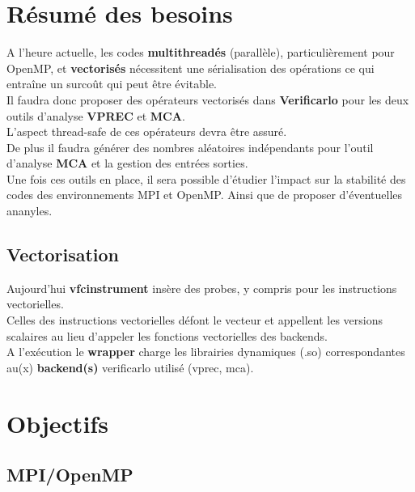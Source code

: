 \documentclass[11pt]{article}
\begin{document}
\section{Résumé des besoins}
\label{sec:orgefc274e}

A l'heure actuelle, les codes \textbf{multithreadés} (parallèle),
particulièrement pour OpenMP, et \textbf{vectorisés} nécessitent une 
sérialisation des opérations ce qui entraîne un surcoût qui peut
être évitable.
\\ \vspace{5mm}
Il faudra donc proposer des opérateurs vectorisés dans \textbf{Verificarlo}
pour les deux outils d'analyse \textbf{VPREC} et \textbf{MCA}.
\\ \vspace{5mm}
L'aspect thread-safe de ces opérateurs devra être assuré.
\\ \vspace{5mm}
De plus il faudra générer des nombres aléatoires indépendants pour
l'outil d'analyse \textbf{MCA} et la gestion des entrées sorties.
\\ \vspace{5mm}
Une fois ces outils en place, il sera possible d'étudier l'impact
sur la stabilité des codes des environnements MPI et OpenMP. Ainsi
que de proposer d'éventuelles ananyles.

\subsection{Vectorisation}
\label{sec:org91a1fd9}

Aujourd’hui \textbf{vfcinstrument} insère des probes, y compris pour les
instructions vectorielles.
\\ \vspace{5mm}
Celles des instructions vectorielles défont le vecteur et appellent les
versions scalaires au lieu d'appeler les fonctions vectorielles des
backends.
\\ \vspace{5mm}
A l’exécution le \textbf{wrapper} charge les librairies dynamiques (.so)
correspondantes au(x) \textbf{backend(s)} verificarlo utilisé (vprec, mca).

\section{Objectifs}
\label{sec:org5e38bc7}
\subsection{MPI/OpenMP}
\label{sec:org9a5fe9a}
\end{document}
